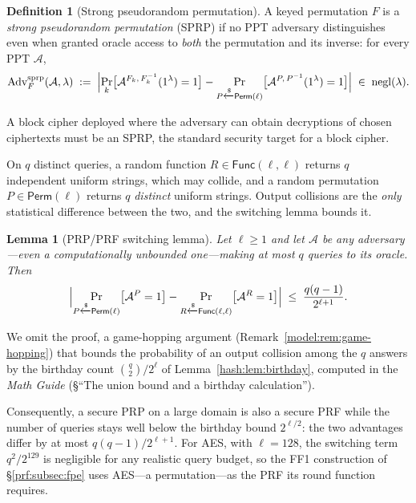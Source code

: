\documentclass[11pt,a4paper]{article}
\newtheorem{lemma}[theorem]{Lemma}
\theoremstyle{definition}
\newtheorem{definition}[theorem]{Definition}
\theoremstyle{remark}
\DeclareMathOperator{\negl}{negl}
\begin{document}
\begin{definition}[Strong pseudorandom permutation]\label{prf:def:sprp}
A keyed permutation \(F\) is a \emph{strong pseudorandom permutation}
(SPRP) if no PPT adversary distinguishes even when granted oracle
access to \emph{both} the permutation and its inverse: for every PPT
\(\mathcal{A}\),
\[
\mathrm{Adv}^{\mathrm{sprp}}_{F}(\mathcal{A}, \lambda)
\;:=\;
\Bigl|
\Pr_{k}\bigl[\mathcal{A}^{F_{k},\, F_{k}^{-1}}(1^{\lambda}) = 1\bigr]
-
\Pr_{P \xleftarrow{\$} \mathsf{Perm}(\ell)}
  \bigl[\mathcal{A}^{P,\, P^{-1}}(1^{\lambda}) = 1\bigr]
\Bigr|
\;\in\; \negl(\lambda).
\]
\end{definition}

A block cipher deployed where the adversary can obtain decryptions of
chosen ciphertexts must be an SPRP, the standard security target for a
block cipher.

On \(q\) distinct queries, a random function
\(R \in \mathsf{Func}(\ell, \ell)\) returns \(q\) independent uniform
strings, which may collide, and a random permutation
\(P \in \mathsf{Perm}(\ell)\) returns \(q\) \emph{distinct} uniform
strings. Output collisions are the \emph{only} statistical difference
between the two, and the switching lemma bounds it.

\begin{lemma}[PRP/PRF switching lemma]\label{prf:lem:switching}
Let \(\ell \ge 1\) and let \(\mathcal{A}\) be any adversary---even a
computationally unbounded one---making at most \(q\) queries to its
oracle. Then
\[
\Bigl|
\Pr_{P \xleftarrow{\$} \mathsf{Perm}(\ell)}
  \bigl[\mathcal{A}^{P} = 1\bigr]
-
\Pr_{R \xleftarrow{\$} \mathsf{Func}(\ell, \ell)}
  \bigl[\mathcal{A}^{R} = 1\bigr]
\Bigr|
\;\le\; \frac{q(q-1)}{2^{\ell+1}}.
\]
\end{lemma}

We omit the proof, a game-hopping argument
(Remark~\ref{model:rem:game-hopping}) that bounds the probability of an
output collision among the \(q\) answers by the birthday count
\(\binom{q}{2}/2^{\ell}\) of Lemma~\ref{hash:lem:birthday}, computed in
the \emph{Math Guide} (\S``The union bound and a birthday
calculation'').

Consequently, a secure PRP on a large domain is also a secure PRF while
the number of queries stays well below the birthday bound
\(2^{\ell/2}\): the two advantages differ by at most
\(q(q-1)/2^{\ell+1}\). For AES, with \(\ell = 128\), the switching term
\(q^{2}/2^{129}\) is negligible for any realistic query budget, so the
FF1 construction of \S\ref{prf:subsec:fpe} uses AES---a
permutation---as the PRF its round function requires.
\end{document}
